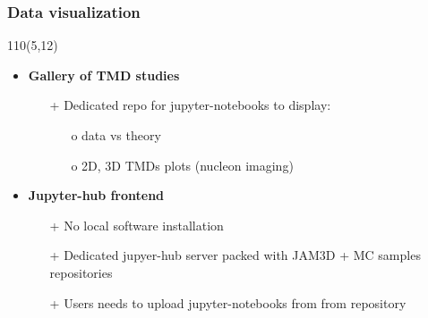 \begin{frame}
\frametitle{\textbf{Data visualization}}
\begin{textblock}{110}(5,12) 
\begin{itemize}
\item \textbf{Gallery of TMD studies}

  \begin{itemize}
  \item[+] Dedicated repo for jupyter-notebooks to display:
  
           \begin{itemize}
           \item[o] data vs theory
           \item[o] 2D, 3D TMDs plots (nucleon imaging)
           \end{itemize}
  \end{itemize}

\item \textbf{Jupyter-hub frontend}

  \begin{itemize}
  \item[+] No local software installation
  \item[+] Dedicated jupyer-hub server packed with JAM3D + 
           MC samples repositories 
  \item[+] Users needs to upload jupyter-notebooks from 
           from repository  
  \end{itemize}

\end{itemize}
\end{textblock}
\end{frame}


